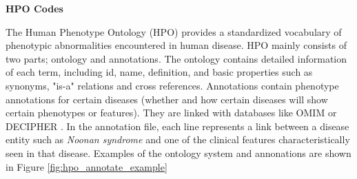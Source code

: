 \begin{table}[ht]
\centering

\caption{An example of ICD-Phecode system. ICD codes are grouped by phecodes and phenotypes. Numbers after the decimal point of phecodes show certain hierarchies of phenotypes. For example, 250---250.1---250.11 represents the hierarchy of Diabetes mellitus---Type 1 diabetes---Type 1 diabetes with ketoacidosis.}
\label{phecode}
\end{table}

\textbf{HPO Codes}

The Human Phenotype Ontology (HPO) provides a standardized vocabulary of phenotypic abnormalities encountered in human disease. HPO mainly consists of two parts; ontology and annotations. The ontology contains detailed information of each term, including id, name, definition, and basic properties such as synonyms, "is-a" relations and cross references. Annotations contain phenotype annotations for certain diseases (whether and how certain diseases will show certain phenotypes or features). They are linked with databases like OMIM \cite{omim} or DECIPHER \cite{decipher}. In the annotation file, each line represents a link between a disease entity such as \textit{Noonan syndrome} and one of the clinical features characteristically seen in that disease. Examples of the ontology system and annonations are shown in Figure \ref{fig:hpo_annotate_example}

